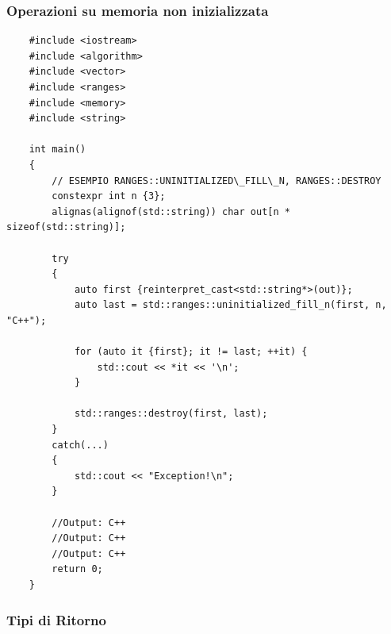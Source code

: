 \subsubsection{Operazioni su memoria non inizializzata}

\label{ranges_uninitialized_memory}

\begin{lstlisting}
	#include <iostream>
	#include <algorithm>
	#include <vector>
	#include <ranges>
	#include <memory>
	#include <string>
	
	int main()
	{
		// ESEMPIO RANGES::UNINITIALIZED\_FILL\_N, RANGES::DESTROY
		constexpr int n {3};
		alignas(alignof(std::string)) char out[n * sizeof(std::string)];
		
		try
		{
			auto first {reinterpret_cast<std::string*>(out)};
			auto last = std::ranges::uninitialized_fill_n(first, n, "C++");
			
			for (auto it {first}; it != last; ++it) {
				std::cout << *it << '\n';
			}
			
			std::ranges::destroy(first, last);
		}
		catch(...)
		{
			std::cout << "Exception!\n";
		}
		
		//Output: C++
		//Output: C++
		//Output: C++
		return 0;
	}
\end{lstlisting}

\subsubsection{Tipi di Ritorno}

